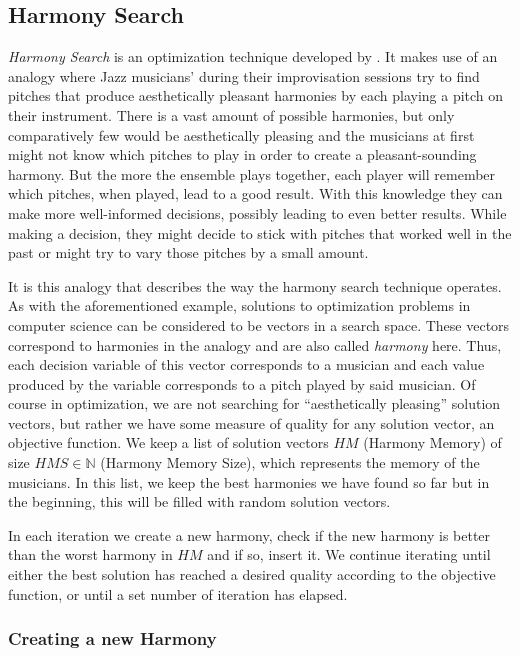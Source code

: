 \subsection{Harmony Search}
\label{subsec:04:hs}

\emph{Harmony Search} \cite{geem_optimal_2000,geem_state---art_2010} is an optimization technique developed by .
It makes use of an analogy where Jazz musicians' during their improvisation sessions \cite{geem_introduction_2022} try to find pitches that produce aesthetically pleasant harmonies by each playing a pitch on their instrument.
There is a vast amount of possible harmonies, but only comparatively few would be aesthetically pleasing and 
the musicians at first might not know which pitches to play in order to create a pleasant-sounding harmony.
But the more the ensemble plays together, each player will remember which pitches, when played, lead to a good result.
With this knowledge they can make more well-informed decisions, possibly leading to even better results.
While making a decision, they might decide to stick with pitches that worked well in the past or might try to vary those pitches by a small amount.

It is this analogy that describes the way the harmony search technique operates.
As with the aforementioned example, solutions to optimization problems in computer science can be considered to be vectors in a search space.
These vectors correspond to harmonies in the analogy and are also called \emph{harmony} here.
Thus, each decision variable of this vector corresponds to a musician and each value produced by the variable corresponds to a pitch played by said musician.
Of course in optimization, we are not searching for \enquote{aesthetically pleasing} solution vectors, but rather we have some measure of quality for any solution vector, an objective function.
We keep a list of solution vectors $HM$ (Harmony Memory) of size $HMS \in \mathbb{N}$ (Harmony Memory Size), which represents the memory of the musicians.
In this list, we keep the best harmonies we have found so far but in the beginning, this will be filled with random solution vectors.

In each iteration we create a new harmony, check if the new harmony is better than the worst harmony in $HM$ and if so, insert it.
We continue iterating until either the best solution has reached a desired quality according to the objective function, or until a set number of iteration has elapsed.

\subsubsection{Creating a new Harmony}

